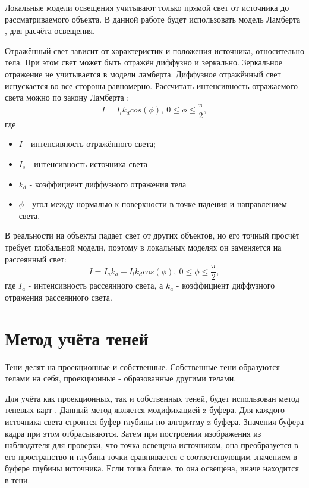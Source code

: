 Локальные модели освещения учитывают только прямой свет от источника до рассматриваемого объекта. В данной работе будет использовать модель Ламберта \cite{kazancev}, для расчёта освещения.

Отражённый свет зависит от характеристик и положения источника, относительно тела. При этом свет может быть отражён диффузно и зеркально. Зеркальное отражение не учитывается в модели ламберта. Диффузное отражённый свет испускается во все стороны равномерно. Рассчитать интенсивность отражаемого света можно по закону Ламберта \cite{kazancev}:
\begin{equation}
	\label{eq:lambert1}
	I = I_{l}k_dcos(\phi),\ 0\leq\phi\leq\frac{\pi}{2},
\end{equation}
где
\begin{itemize}
	\item $I$ - интенсивность отражённого света;
	\item $I_s$ - интенсивность источника света
	\item $k_d$ - коэффициент диффузного отражения тела
	\item $\phi$ - угол между нормалью к поверхности в точке падения и направлением света.
\end{itemize} 

В реальности на объекты падает свет от других объектов, но его точный просчёт требует глобальной модели, поэтому в локальных моделях он заменяется на рассеянный свет:
\begin{equation}
	\label{eq:lambert2}
	I = I_ak_a + I_{l}k_dcos(\phi),\ 0\leq\phi\leq\frac{\pi}{2},
\end{equation}
где $I_a$ - интенсивность рассеянного света, а $k_a$ - коэффициент диффузного отражения рассеянного света. 

\section{Метод учёта теней}

Тени делят на проекционные и собственные. Собственные тени образуются телами на себя, проекционные - образованные другими телами.

Для учёта как проекционных, так и собственных теней, будет использован метод теневых карт \cite{gabriella}. Данный метод является модификацией z-буфера. Для каждого источника света строится буфер глубины по алгоритму z-буфера. Значения буфера кадра при этом отбрасываются. Затем при построении изображения из наблюдателя для проверки, что точка освещена источником, она преобразуется в его пространство и глубина точки сравнивается с соответствующим значением в буфере глубины источника. Если точка ближе, то она освещена, иначе находится в тени.


